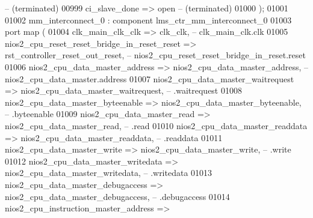 \begin{DoxyCode}
{           -- (terminated)}
00999             ci\_slave\_done       => \textcolor{keywordflow}{open}                                                                    
           \textcolor{keyword}{-- (terminated)}
01000         \textcolor{vhdlchar}{)};
01001 
01002     mm_interconnect_0 : \textcolor{keywordflow}{component} lms\_ctr\_mm\_interconnect\_0
01003         \textcolor{keywordflow}{port} \textcolor{keywordflow}{map} (
01004             clk\_main\_clk\_clk                            => clk_clk,\textcolor{keyword}{                                        
                   --                          clk\_main\_clk.clk}
01005             nios2\_cpu\_reset\_reset\_bridge\_in\_reset\_reset => 
      rst_controller_reset_out_reset,\textcolor{keyword}{                              -- nios2\_cpu\_reset\_reset\_bridge\_in\_reset.reset}
01006             nios2\_cpu\_data\_master\_address               => 
      nios2_cpu_data_master_address,\textcolor{keyword}{                               --                
       nios2\_cpu\_data\_master.address}
01007             nios2\_cpu\_data\_master\_waitrequest           => 
      nios2_cpu_data_master_waitrequest,\textcolor{keyword}{                           --                                     
       .waitrequest}
01008             nios2\_cpu\_data\_master\_byteenable            => 
      nios2_cpu_data_master_byteenable,\textcolor{keyword}{                            --                                     
       .byteenable}
01009             nios2\_cpu\_data\_master\_read                  => 
      nios2_cpu_data_master_read,\textcolor{keyword}{                                  --                                      .read}
01010             nios2\_cpu\_data\_master\_readdata              => 
      nios2_cpu_data_master_readdata,\textcolor{keyword}{                              --                                     
       .readdata}
01011             nios2\_cpu\_data\_master\_write                 => 
      nios2_cpu_data_master_write,\textcolor{keyword}{                                 --                                      .write}
01012             nios2\_cpu\_data\_master\_writedata             => 
      nios2_cpu_data_master_writedata,\textcolor{keyword}{                             --                                     
       .writedata}
01013             nios2\_cpu\_data\_master\_debugaccess           => 
      nios2_cpu_data_master_debugaccess,\textcolor{keyword}{                           --                                     
       .debugaccess}
01014             nios2\_cpu\_instruction\_master\_address        => 

\end{DoxyCode}

